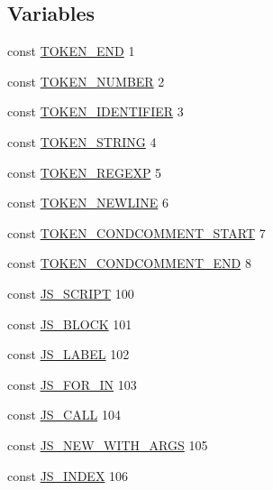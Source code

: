 \subsection*{Variables}
\begin{DoxyCompactItemize}
\item 
const \hyperlink{jsminplus_8php_ab1dc5bd008a10ba2cd689fc374b1202e}{T\+O\+K\+E\+N\+\_\+\+E\+N\+D} 1
\item 
const \hyperlink{jsminplus_8php_a68cf280d438d85f4afe4e726e18b7671}{T\+O\+K\+E\+N\+\_\+\+N\+U\+M\+B\+E\+R} 2
\item 
const \hyperlink{jsminplus_8php_abec5059a97dfdbb70b92143ece0e6de7}{T\+O\+K\+E\+N\+\_\+\+I\+D\+E\+N\+T\+I\+F\+I\+E\+R} 3
\item 
const \hyperlink{jsminplus_8php_a157d70e9aef6d31de4bf2367865bcca1}{T\+O\+K\+E\+N\+\_\+\+S\+T\+R\+I\+N\+G} 4
\item 
const \hyperlink{jsminplus_8php_aa6566e793b05b27f288c6cd6ee36c456}{T\+O\+K\+E\+N\+\_\+\+R\+E\+G\+E\+X\+P} 5
\item 
const \hyperlink{jsminplus_8php_a1b58fc09d92bc692b3ffe3db71fe9c79}{T\+O\+K\+E\+N\+\_\+\+N\+E\+W\+L\+I\+N\+E} 6
\item 
const \hyperlink{jsminplus_8php_a3962a06609192398235e4827d1364bba}{T\+O\+K\+E\+N\+\_\+\+C\+O\+N\+D\+C\+O\+M\+M\+E\+N\+T\+\_\+\+S\+T\+A\+R\+T} 7
\item 
const \hyperlink{jsminplus_8php_acb62692bf2ae3c9c09166c6674e8db87}{T\+O\+K\+E\+N\+\_\+\+C\+O\+N\+D\+C\+O\+M\+M\+E\+N\+T\+\_\+\+E\+N\+D} 8
\item 
const \hyperlink{jsminplus_8php_a907e8d079000d52beb1f25845361333a}{J\+S\+\_\+\+S\+C\+R\+I\+P\+T} 100
\item 
const \hyperlink{jsminplus_8php_ad221bfc2e62624ccd97cf789447aca05}{J\+S\+\_\+\+B\+L\+O\+C\+K} 101
\item 
const \hyperlink{jsminplus_8php_a4f1467fac3cbd4e3d39705b6fbfd8411}{J\+S\+\_\+\+L\+A\+B\+E\+L} 102
\item 
const \hyperlink{jsminplus_8php_a946e4b425a2eef1e06f636e60d114f6e}{J\+S\+\_\+\+F\+O\+R\+\_\+\+I\+N} 103
\item 
const \hyperlink{jsminplus_8php_aaec06528d8f101c5b3030da2e72e9f75}{J\+S\+\_\+\+C\+A\+L\+L} 104
\item 
const \hyperlink{jsminplus_8php_a85c6c091f450c52ca04f4e3a0bfc4e5c}{J\+S\+\_\+\+N\+E\+W\+\_\+\+W\+I\+T\+H\+\_\+\+A\+R\+G\+S} 105
\item 
const \hyperlink{jsminplus_8php_ad5635b7ba8351c16df071e2b307e7026}{J\+S\+\_\+\+I\+N\+D\+E\+X} 106

\end{DoxyCompactItemize}
